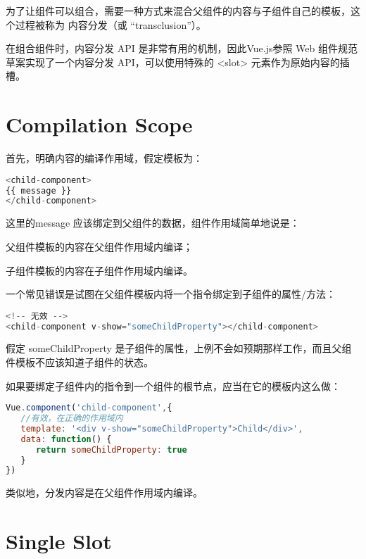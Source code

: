 为了让组件可以组合，需要一种方式来混合父组件的内容与子组件自己的模板，这个过程被称为 内容分发（或 “transclusion”）。

在组合组件时，内容分发 API 是非常有用的机制，因此Vue.js参照 Web 组件规范草案实现了一个内容分发 API，可以使用特殊的 <slot> 元素作为原始内容的插槽。


\section{Compilation Scope}

首先，明确内容的编译作用域，假定模板为：


\begin{lstlisting}[language=JavaScript]
<child-component>
{{ message }}
</child-component>
\end{lstlisting}

这里的message 应该绑定到父组件的数据，组件作用域简单地说是：

\begin{compactitem}
\item 父组件模板的内容在父组件作用域内编译；
\item 子组件模板的内容在子组件作用域内编译。
\end{compactitem}

一个常见错误是试图在父组件模板内将一个指令绑定到子组件的属性/方法：


\begin{lstlisting}[language=JavaScript]
<!-- 无效 -->
<child-component v-show="someChildProperty"></child-component>
\end{lstlisting}

假定 someChildProperty 是子组件的属性，上例不会如预期那样工作，而且父组件模板不应该知道子组件的状态。

如果要绑定子组件内的指令到一个组件的根节点，应当在它的模板内这么做：

\begin{lstlisting}[language=JavaScript]
Vue.component('child-component',{
   //有效，在正确的作用域内
   template: '<div v-show="someChildProperty">Child</div>',
   data: function() {
      return someChildProperty: true
   }
})
\end{lstlisting}

类似地，分发内容是在父组件作用域内编译。


\section{Single Slot}


